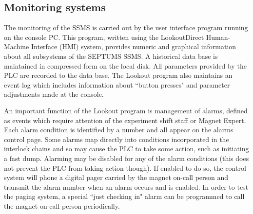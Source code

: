 \subsection {\bf Monitoring systems}

The monitoring of the SSMS is carried out by the user interface program running on the 
console PC.  This program, written using the LookoutDirect Human-Machine Interface (HMI) system, provides 
numeric and graphical information about all subsystems of the SEPTUMS SSMS.  A historical data base is 
maintained in compressed form on the local disk.  All parameters provided by the PLC are recorded to the 
data base.  The Lookout program also maintains an event log which includes information about ``button presses" 
and parameter adjustments made at the console.

An important function of the Lookout program is management of alarms, defined as events which require attention 
of the experiment shift staff or Magnet Expert.  Each alarm condition is identified by a number and all appear 
on the alarms control page.  Some alarms map directly into conditions incorporated in the interlock chains 
and so may cause the PLC to take some action, such as initiating a fast dump.  Alarming may be disabled for any 
of the alarm conditions (this does not prevent the PLC from taking action though).  If enabled to do so, the 
control system will phone a digital pager carried by the magnet on-call person and transmit the alarm number 
when an alarm occurs and is enabled.  In order to test the paging system, a special ``just checking in" alarm 
can be programmed to call the magnet on-call person periodically.


